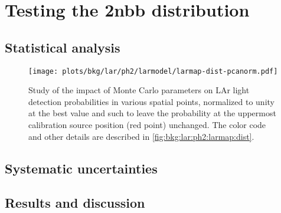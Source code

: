 
\chapter{Testing the 2nbb distribution}%
\label{chap:2nbb-ana}

\section{Statistical analysis}

\begin{figure}
  \centering
  \texttt{[image: plots/bkg/lar/ph2/larmodel/larmap-dist-pcanorm.pdf]}
  \caption{%
    Study of the impact of Monte Carlo parameters on LAr light detection probabilities in
    various spatial points, normalized to unity at the best value and such to leave the
    probability at the uppermost calibration source position (red point) unchanged.  The
    color code and other details are described in \cref{fig:bkg:lar:ph2:larmap:dist}.
  }\label{fig:bkg:lar:ph2:larmap:dist-pcanorm}
\end{figure}

\section{Systematic uncertainties}%
\label{sec:2nbb-ana:systematics}

\section{Results and discussion}

